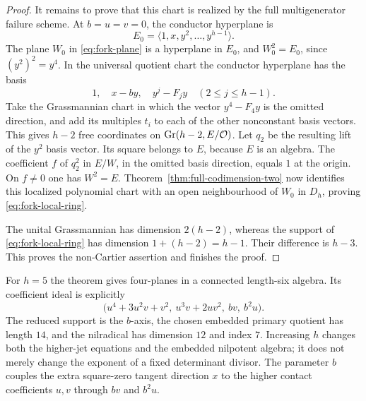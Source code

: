 \begin{proof}
It remains to prove that this chart is realized by the full
multigenerator failure scheme. At $b=u=v=0$, the conductor hyperplane
is
\[
 E_0=\langle1,x,y^2,\ldots,y^{h-1}\rangle.
\]
The plane $W_0$ in \eqref{eq:fork-plane} is a hyperplane in $E_0$,
and $W_0^2=E_0$, since $(y^2)^2=y^4$. In the universal quotient
chart the conductor hyperplane has the basis
\[
 1,\quad x-by,\quad y^j-F_jy\quad(2\le j\le h-1).
\]
Take the Grassmannian chart in which the vector $y^4-F_4y$ is the
omitted direction, and add its multiples $t_i$ to each of the other
nonconstant basis vectors. This gives $h-2$ free coordinates on
$\operatorname{Gr}(h-2,E/\mathcal O)$. Let $q_2$ be the resulting lift of the
$y^2$ basis vector. Its square belongs to $E$, because $E$ is an
algebra. The coefficient $f$ of $q_2^2$ in $E/W$, in the omitted
basis direction, equals $1$ at the origin. On $f\ne0$ one has
$W^2=E$. Theorem~\ref{thm:full-codimension-two} now identifies this
localized polynomial chart with an open neighbourhood of $W_0$
in $D_h$, proving \eqref{eq:fork-local-ring}.

The unital Grassmannian has dimension $2(h-2)$, whereas the support
of \eqref{eq:fork-local-ring} has dimension $1+(h-2)=h-1$.
Their difference is $h-3$. This proves the non-Cartier assertion
and finishes the proof.
\end{proof}

For $h=5$ the theorem gives four-planes in a connected length-six
algebra. Its coefficient ideal is explicitly
\[
 \bigl(u^4+3u^2v+v^2,\ u^3v+2uv^2,\ bv,\ b^2u\bigr).
\]
The reduced support is the $b$-axis, the chosen embedded primary
quotient has length $14$, and the nilradical has dimension $12$
and index $7$. Increasing $h$ changes both the higher-jet equations
and the embedded nilpotent algebra; it does not merely change the
exponent of a fixed determinant divisor. The parameter $b$ couples
the extra square-zero tangent direction $x$ to the higher contact
coefficients $u,v$ through $bv$ and $b^2u$.

